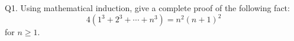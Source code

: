 Q1.
Using mathematical induction, give a complete proof of the following fact:
\[
  4(1^3 + 2^3 + \cdots + n^3) = n^2(n+1)^2
\]
for $n \geq 1$.

